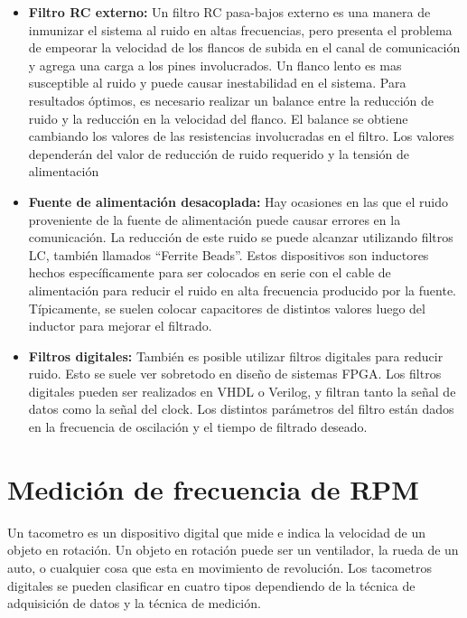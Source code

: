 \begin{itemize}
  \item \textbf{Filtro RC externo:} Un filtro RC pasa-bajos externo es una manera de inmunizar el sistema al ruido en altas frecuencias, pero presenta el problema de empeorar la velocidad de los flancos de subida en el canal de comunicación y agrega una carga a los pines involucrados. Un flanco lento es mas susceptible al ruido y puede causar inestabilidad en el sistema. Para resultados óptimos, es necesario realizar un balance entre la reducción de ruido y la reducción en la velocidad del flanco. El balance se obtiene cambiando los valores de las resistencias involucradas en el filtro. Los valores dependerán del valor de reducción de ruido requerido y la tensión de alimentación
  \item \textbf{Fuente de alimentación desacoplada:} Hay ocasiones en las que el ruido proveniente de la fuente de alimentación puede causar errores en la comunicación. La reducción de este ruido se puede alcanzar utilizando filtros LC, también llamados ``Ferrite Beads''. Estos dispositivos son inductores hechos específicamente para ser colocados en serie con el cable de alimentación para reducir el ruido en alta frecuencia producido por la fuente. Típicamente, se suelen colocar capacitores de distintos valores luego del inductor para mejorar el filtrado. 
  \item \textbf{Filtros digitales:} También es posible utilizar filtros digitales para reducir ruido. Esto se suele ver sobretodo en diseño de sistemas FPGA. Los filtros digitales pueden ser realizados en VHDL o Verilog, y filtran tanto la señal de datos como la señal del clock. Los distintos parámetros del filtro están dados en la frecuencia de oscilación y el tiempo de filtrado deseado. 
\end{itemize}



\section{Medición de frecuencia de RPM} %
\label{sec:medicion_de_frecuencia_de_rpm}

Un tacometro es un dispositivo digital que mide e indica la velocidad de un objeto en rotación. Un objeto en rotación puede ser un ventilador, la rueda de un auto, o cualquier cosa que esta en movimiento de revolución. Los tacometros digitales se pueden clasificar en cuatro tipos dependiendo de la técnica de adquisición de datos y la técnica de medición.


